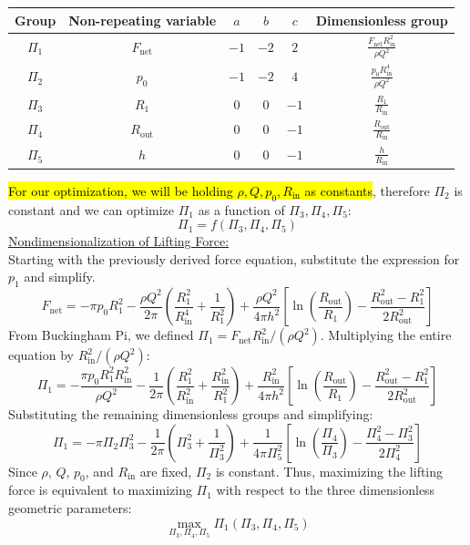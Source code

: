 \documentclass[11pt]{article}
\begin{document}
\begin{table}[H]
    \centering
    \renewcommand{\arraystretch}{2.5}
    \setlength{\extrarowheight}{3pt}
    \begin{tabular}{c c c c c c}
        \hline
        Group & Non-repeating variable & $a$ & $b$ & $c$ & Dimensionless group \\
        \hline
        $\Pi_1$ & $F_{\mathrm{net}}$ & $-1$ & $-2$ & $2$ &
        $\displaystyle\frac{F_{\mathrm{net}}R_{\mathrm{in}}^2}{\rho Q^2}$ \\

        $\Pi_2$ & $p_0$ & $-1$ & $-2$ & $4$ &
        $\displaystyle\frac{p_0R_{\mathrm{in}}^4}{\rho Q^2}$ \\

        $\Pi_3$ & $R_1$ & $0$ & $0$ & $-1$ &
        $\displaystyle\frac{R_1}{R_{\mathrm{in}}}$ \\

        $\Pi_4$ & $R_{\mathrm{out}}$ & $0$ & $0$ & $-1$ &
        $\displaystyle\frac{R_{\mathrm{out}}}{R_{\mathrm{in}}}$ \\

        $\Pi_5$ & $h$ & $0$ & $0$ & $-1$ &
        $\displaystyle\frac{h}{R_{\mathrm{in}}}$ \\
        \hline
    \end{tabular}
\end{table}
\hl{For our optimization, we will be holding $\rho, Q, p_0, R_\text{in}$ as constants}, therefore $\Pi_2$ is constant and we can optimize $\Pi_1$ as a function of $\Pi_3, \Pi_4, \Pi_5$:
\[
\Pi_1=f(\Pi_3,\Pi_4,\Pi_5)
\]
\underline{Nondimensionalization of Lifting Force:}\\
Starting with the previously derived force equation, substitute the expression for $p_1$ and simplify.
\[
F_{\mathrm{net}}=-\pi p_0R_1^2-\frac{\rho Q^2}{2\pi}\left(\frac{R_1^2}{R_{\mathrm{in}}^4}+\frac{1}{R_1^2}\right)+\frac{\rho Q^2}{4\pi h^2}\left[\ln\left(\frac{R_{\mathrm{out}}}{R_1}\right)-\frac{R_{\mathrm{out}}^2-R_1^2}{2R_{\mathrm{out}}^2}\right]
\]
From Buckingham Pi, we defined $\Pi_1=F_{\mathrm{net}}R_{\mathrm{in}}^2/(\rho Q^2)$. Multiplying the entire equation by $R_{\mathrm{in}}^2/(\rho Q^2)$:
\[
\Pi_1=-\frac{\pi p_0R_1^2R_{\mathrm{in}}^2}{\rho Q^2}-\frac{1}{2\pi}\left(\frac{R_1^2}{R_{\mathrm{in}}^2}+\frac{R_{\mathrm{in}}^2}{R_1^2}\right)+\frac{R_{\mathrm{in}}^2}{4\pi h^2}\left[\ln\left(\frac{R_{\mathrm{out}}}{R_1}\right)-\frac{R_{\mathrm{out}}^2-R_1^2}{2R_{\mathrm{out}}^2}\right]
\]
Substituting the remaining dimensionless groups and simplifying:
\[
\boxed{\Pi_1=-\pi\Pi_2\Pi_3^2-\frac{1}{2\pi}\left(\Pi_3^2+\frac{1}{\Pi_3^2}\right)+\frac{1}{4\pi\Pi_5^2}\left[\ln\left(\frac{\Pi_4}{\Pi_3}\right)-\frac{\Pi_4^2-\Pi_3^2}{2\Pi_4^2}\right]}
\]
Since $\rho$, $Q$, $p_0$, and $R_{\mathrm{in}}$ are fixed, $\Pi_2$ is constant. Thus, maximizing the lifting force is equivalent to maximizing $\Pi_1$ with respect to the three dimensionless geometric parameters:
\[
\boxed{\max_{\Pi_3,\Pi_4,\Pi_5}\Pi_1(\Pi_3,\Pi_4,\Pi_5)}
\]
\end{document}
